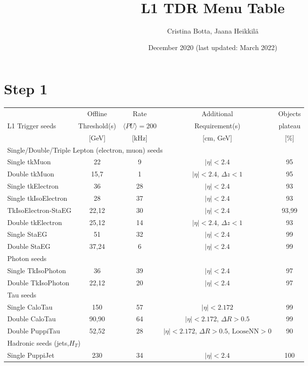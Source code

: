 \documentclass{article}
\title{L1 TDR Menu Table}
\author{Cristina Botta, Jaana Heikkilä}
\date{December 2020 (last updated: March 2022)}
\newcommand{\HT}{\ensuremath{H_{T}}\xspace}
\begin{document}
\section{Step 1}
\begin{table}[th] 
\label{tab:Step1Menu} 
\begin{adjustbox}{width=\textwidth}
{\scriptsize
\begin{tabular}	{|l|c|c|c|c|} 
\hline	             &	  Offline   & 	Rate  &  Additional & Objects    \\
       L1 Trigger seeds &  Threshold(s)  &  $\langle {PU} \rangle = 200$ &  Requirement(s)  & plateau   \\
	                 &  [GeV]  &  [kHz]  &   [cm, GeV]  & [\%]	\\   
\hline
\hline \multicolumn{5}{|l|}{Single/Double/Triple Lepton (electron, muon) seeds} \\
\hline Single tkMuon & 22 & 9 & $|\eta|<2.4$ & 95\\
\hline Double tkMuon & 15,7 & 1 & $|\eta|<2.4$, ${\Delta}z <1$ & 95\\
\hline Single tkElectron & 36 & 28 & $|\eta|<2.4$ & 93\\
\hline Single tkIsoElectron & 28 & 37 & $|\eta|<2.4$ & 93\\
\hline TkIsoElectron-StaEG & 22,12 & 30 & $|\eta|<2.4$ & 93,99\\
\hline Double tkElectron & 25,12 & 14 & $|\eta|<2.4$, ${\Delta}z <1$ & 93\\
\hline Single StaEG & 51 & 32 & $|\eta|<2.4$ & 99\\
\hline Double StaEG & 37,24 & 6 & $|\eta|<2.4$ & 99\\
\hline
\hline \multicolumn{5}{|l|}{Photon seeds} \\
\hline Single TkIsoPhoton & 36 & 39 & $|\eta|<2.4$ & 97\\
\hline Double TkIsoPhoton & 22,12 & 20 & $|\eta|<2.4$ & 97\\
\hline
\hline \multicolumn{5}{|l|}{Tau seeds} \\
\hline Single CaloTau & 150 & 57 & $|\eta|<2.172$ & 99\\
\hline Double CaloTau & 90,90 & 64 & $|\eta|<2.172$, ${\Delta}R >0.5$ & 99\\
\hline Double PuppiTau & 52,52 & 28 & $|\eta|<2.172$, ${\Delta}R >0.5$, $\text{LooseNN} > 0$ & 90\\
\hline
\hline \multicolumn{5}{|l|}{Hadronic seeds (jets,\HT)} \\
\hline Single PuppiJet & 230 & 34 & $|\eta|<2.4$ & 100\\

\end{tabular}}
\end{adjustbox}
\end{table}
\end{document}
